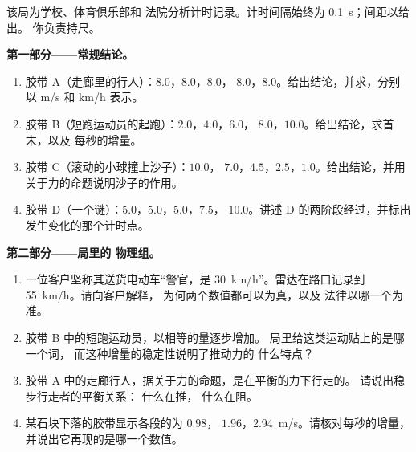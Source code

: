 \begin{problem}\label{pb:g9:uniform-varied-motion:1}
该局为学校、体育俱乐部和
法院分析计时记录。计时间隔始终为 \qty{0.1}{s}；间距以给出。
你负责持尺。

\medskip\noindent\textbf{第一部分——常规结论。}
\begin{enumerate}
  \item 胶带 A（走廊里的行人）：$8.0$，$8.0$，$8.0$，
        $8.0$，$8.0$。给出结论，并求，分别以 \unit{m/s}
        和 \unit{km/h} 表示。
  \item 胶带 B（短跑运动员的起跑）：$2.0$，$4.0$，$6.0$，
        $8.0$，$10.0$。给出结论，求首末，以及
        每秒的增量。
  \item 胶带 C（滚动的小球撞上沙子）：$10.0$，
        $7.0$，$4.5$，$2.5$，$1.0$。给出结论，并用
        关于力的命题说明沙子的作用。
  \item 胶带 D（一个谜）：$5.0$，$5.0$，$5.0$，$7.5$，
        $10.0$。讲述 D 的两阶段经过，并标出
        发生变化的那个计时点。
\end{enumerate}

\medskip\noindent\textbf{第二部分——局里的
物理组。}
\begin{enumerate}[resume]
  \item 一位客户坚称其送货电动车“警官，是
        \qty{30}{km/h}”。雷达在路口记录到
        \qty{55}{km/h}。请向客户解释，
        为何两个数值都可以为真，以及
        法律以哪一个为准。
  \item 胶带 B 中的短跑运动员，以相等的量逐步增加。
        局里给这类运动贴上的是哪一个词，
        而这种增量的稳定性说明了推动力的
        什么特点？
  \item 胶带 A 中的走廊行人，据关于力的命题，是在平衡的力下行走的。
        请说出稳步行走者的平衡关系：
        什么在推，
        什么在阻。
  \item 某石块下落的胶带显示各段的为 $0.98$，
        $1.96$，\qty{2.94}{m/s}。请核对每秒的增量，
        并说出它再现的是哪一个数值。
\end{enumerate}


\end{problem}
